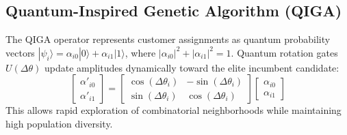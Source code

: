 \subsection{Quantum-Inspired Genetic Algorithm (QIGA)}
The QIGA operator represents customer assignments as quantum probability vectors $|\psi_i\rangle = \alpha_{i0} |0\rangle + \alpha_{i1} |1\rangle$, where $|\alpha_{i0}|^2 + |\alpha_{i1}|^2 = 1$. Quantum rotation gates $U(\Delta \theta)$ update amplitudes dynamically toward the elite incumbent candidate:
\begin{equation}
\begin{bmatrix} \alpha'_{i0} \\ \alpha'_{i1} \end{bmatrix} = \begin{bmatrix} \cos(\Delta \theta_i) & -\sin(\Delta \theta_i) \\ \sin(\Delta \theta_i) & \cos(\Delta \theta_i) \end{bmatrix} \begin{bmatrix} \alpha_{i0} \\ \alpha_{i1} \end{bmatrix}
\end{equation}
This allows rapid exploration of combinatorial neighborhoods while maintaining high population diversity.

